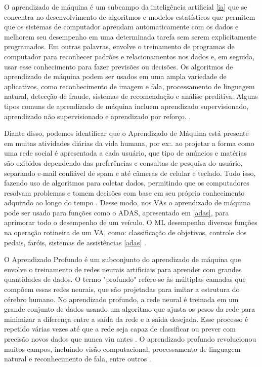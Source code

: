 O aprendizado de máquina é um subcampo da inteligência artificial \ref{ia} que se concentra no desenvolvimento de algoritmos e modelos estatísticos que permitem que os sistemas de computador aprendam automaticamente com os dados e melhorem seu desempenho em uma determinada tarefa sem serem explicitamente programados. Em outras palavras, envolve o treinamento de programas de computador para reconhecer padrões e relacionamentos nos dados e, em seguida, usar esse conhecimento para fazer previsões ou decisões. Os algoritmos de aprendizado de máquina podem ser usados em uma ampla variedade de aplicativos, como reconhecimento de imagem \cite{review-auto} e fala, processamento de linguagem natural, detecção de fraude, sistemas de recomendação e análise preditiva. Alguns tipos comuns de aprendizado de máquina incluem aprendizado supervisionado, aprendizado não supervisionado e aprendizado por reforço. \cite{software-review, software-cnn}.

Diante disso, podemos identificar que o Aprendizado de Máquina está presente em muitas atividades diárias da vida humana, por ex:. ao projetar a forma como uma rede social é apresentada a cada usuário, que tipo de anúncios e matérias são exibidos dependendo das preferências e consultas de pesquisa do usuário, separando e-mail confiável de spam e até câmeras de celular e teclado. Tudo isso, fazendo uso de algoritmos para coletar dados, permitindo que os computadores resolvam problemas e tomem decisões com base em seu próprio conhecimento adquirido ao longo do tempo \cite{caio}. Desse modo, nos VAs o aprendizado de máquina pode ser usado para funções como o ADAS, apresentado em \ref{adas}, para aprimorar todo o desempenho de um veículo. O ML desempenha diversas funções na operação rotineira de um VA, como: classificação de objetivos, controle dos pedais, faróis, sistemas de assistências \ref{adas} \cite{aplicacao2}.

 \label{Profunda}

O Aprendizado Profundo é um subconjunto do aprendizado de máquina que envolve o treinamento de redes neurais artificiais para aprender com grandes quantidades de dados. O termo "profundo" refere-se às múltiplas camadas que compõem essas redes neurais, que são projetadas para imitar a estrutura do cérebro humano. No aprendizado profundo, a rede neural é treinada em um grande conjunto de dados usando um algoritmo que ajusta os pesos da rede para minimizar a diferença entre a saída da rede e a saída desejada. Esse processo é repetido várias vezes até que a rede seja capaz de classificar ou prever com precisão novos dados que nunca viu antes \cite{software-cnn}. O aprendizado profundo revolucionou muitos campos, incluindo visão computacional, processamento de linguagem natural e reconhecimento de fala, entre outros \cite{review-auto, software-review}. 

